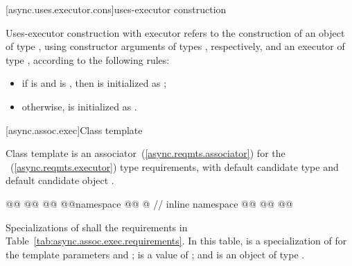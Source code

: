 [async.uses.executor.cons]{uses-executor construction}

%
\pnum
Uses-executor construction with executor  refers to the construction of an object  of type , using constructor arguments  of types , respectively, and an executor  of type , according to the following rules:

\begin{itemize}
\item
if  is 
and  is ,
then  is initialized as ;

\item
otherwise,  is initialized as .
\end{itemize}




[async.assoc.exec]{Class template }

%
\pnum
Class template  is an associator~(\ref{async.reqmts.associator}) for the ~(\ref{async.reqmts.executor}) type requirements, with default candidate type  and default candidate object .

\begin{codeblock}
@@
@@
@@
@@namespace @@ @ // inline namespace \namespacever
@@
@@
@@
\end{codeblock}

%
\pnum
Specializations of  shall  the requirements in Table~\ref{tab:async.assoc.exec.requirements}.
In this table,  is a specialization of 
for the template parameters  and ;
 is a  value of  ;
and  is an object of type .

